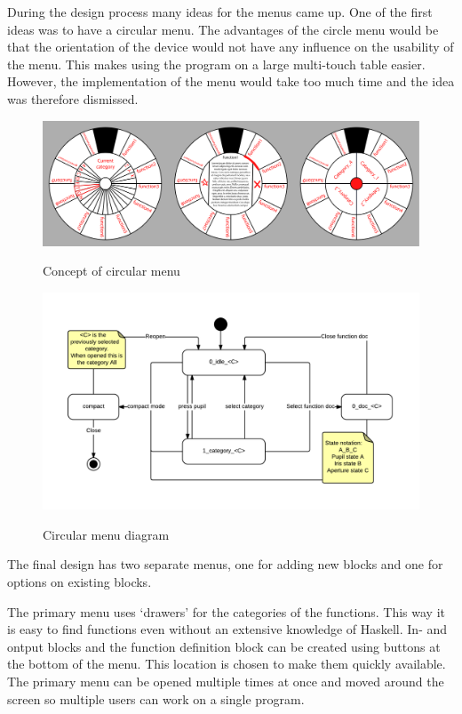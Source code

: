 During the design process many ideas for the menus came up.
One of the first ideas was to have a circular menu. \label{circular_menu}
The advantages of the circle menu would be that the orientation of the device would not have any influence on the usability of the menu.
This makes using the program on a large multi-touch table easier.
However, the implementation of the menu would take too much time and the idea was therefore dismissed.

\begin{figure}[p]
	\centering
	\includegraphics[width=\textwidth]{Images/circlary}
	\label{fig:circlary}
	\caption{Concept of circular menu}
\end{figure}
\begin{figure}[p]
	\centering
	\includegraphics[scale=0.5]{Images/diagram-circlary}
	\label{fig:diagram-circlary}
	\caption{Circular menu diagram}
\end{figure}

The final design has two separate menus, one for adding new blocks and one for options on existing blocks.

The primary menu uses `drawers' for the categories of the functions.
This way it is easy to find functions even without an extensive knowledge of Haskell.
In- and ontput blocks and the function definition block can be created using buttons at the bottom of the menu.
This location is chosen to make them quickly available.
The primary menu can be opened multiple times at once and moved around the screen so multiple users can work on a single program.

